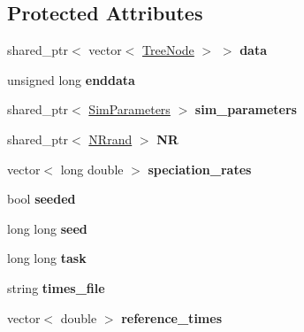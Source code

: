 \subsection*{Protected Attributes}
\begin{DoxyCompactItemize}
\item 
shared\+\_\+ptr$<$ vector$<$ \hyperlink{class_tree_node}{Tree\+Node} $>$ $>$ {\bfseries data}\hypertarget{class_tree_a959e6513ebc4e0dba488349a644e909a}{}\label{class_tree_a959e6513ebc4e0dba488349a644e909a}

\item 
unsigned long {\bfseries enddata}\hypertarget{class_tree_a50344999e6b64d15eef935b1f6023471}{}\label{class_tree_a50344999e6b64d15eef935b1f6023471}

\item 
shared\+\_\+ptr$<$ \hyperlink{struct_sim_parameters}{Sim\+Parameters} $>$ {\bfseries sim\+\_\+parameters}\hypertarget{class_tree_aa838b517c44d9693f8b485c57989097f}{}\label{class_tree_aa838b517c44d9693f8b485c57989097f}

\item 
shared\+\_\+ptr$<$ \hyperlink{class_n_rrand}{N\+Rrand} $>$ {\bfseries NR}\hypertarget{class_tree_a20790866da998f8cb7d0f1455d9fbcc5}{}\label{class_tree_a20790866da998f8cb7d0f1455d9fbcc5}

\item 
vector$<$ long double $>$ {\bfseries speciation\+\_\+rates}\hypertarget{class_tree_a61b4349fe78d09ac06eff4b7d6833105}{}\label{class_tree_a61b4349fe78d09ac06eff4b7d6833105}

\item 
bool {\bfseries seeded}\hypertarget{class_tree_a78935befd45946b8e69023bffca59c1d}{}\label{class_tree_a78935befd45946b8e69023bffca59c1d}

\item 
long long {\bfseries seed}\hypertarget{class_tree_a821c3c83d8bad2a6c3dba687533f6a53}{}\label{class_tree_a821c3c83d8bad2a6c3dba687533f6a53}

\item 
long long {\bfseries task}\hypertarget{class_tree_a5f74fd75a2d2a606703b19a3a2d177d2}{}\label{class_tree_a5f74fd75a2d2a606703b19a3a2d177d2}

\item 
string {\bfseries times\+\_\+file}\hypertarget{class_tree_a5e031ea8d94f48288547116a9e7d7add}{}\label{class_tree_a5e031ea8d94f48288547116a9e7d7add}

\item 
vector$<$ double $>$ {\bfseries reference\+\_\+times}\hypertarget{class_tree_a56bb1ea64368f5b705360a435350f9d5}{}\label{class_tree_a56bb1ea64368f5b705360a435350f9d5}


\end{DoxyCompactItemize}
